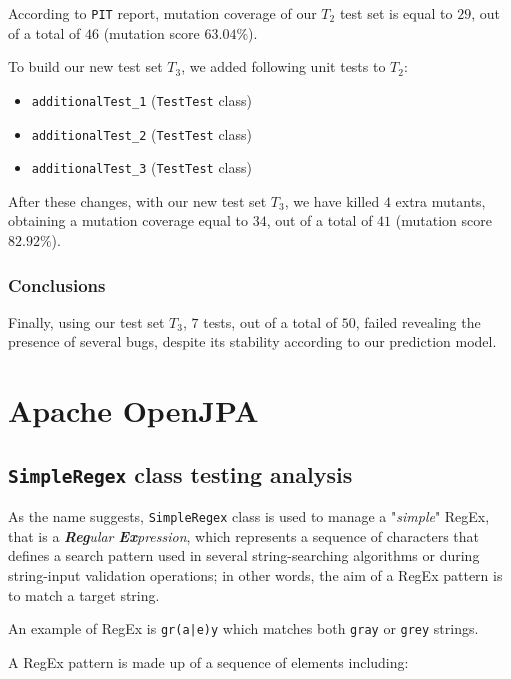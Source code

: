 \documentclass[sigconf]{acmart}
\begin{document}
According to \texttt{PIT} report, mutation coverage of our $T_2$ test set is equal to $29$, out of a total of $46$ (mutation score $63.04 \%$). 

To build our new test set $T_3$, we added following unit tests to $T_2$:

\begin{itemize}
\item \texttt{additionalTest\_1} (\texttt{TestTest} class)
\item \texttt{additionalTest\_2} (\texttt{TestTest} class)
\item \texttt{additionalTest\_3} (\texttt{TestTest} class)
\end{itemize}

After these changes, with our new test set $T_3$, we have killed $4$ extra mutants, obtaining a mutation coverage equal to $34$, out of a total of $41$ (mutation score $82.92 \%$).

\subsubsection{Conclusions}

Finally, using our test set $T_3$, $7$ tests, out of a total of $50$, failed revealing the presence of several bugs, despite its stability according to our prediction model.

\section{Apache OpenJPA\texttrademark}

\subsection{\texttt{SimpleRegex} class testing analysis}

As the name suggests, \texttt{SimpleRegex} class is used to manage a "\textit{simple}" RegEx, that is a \textit{\textbf{Reg}ular \textbf{Ex}pression}, which represents a sequence of characters that defines a search pattern used in several string-searching algorithms or during string-input validation operations; in other words, the aim of a RegEx pattern is to match a target string.

An example of RegEx is \colorbox{beaublue}{\texttt{gr(a|e)y}} which matches both \colorbox{beaublue}{\texttt{gray}} or \colorbox{beaublue}{\texttt{grey}} strings.

A RegEx pattern is made up of a sequence of elements including:
\end{document}
